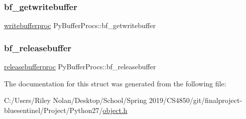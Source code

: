 \subsubsection{\texorpdfstring{bf\_getwritebuffer}{bf\_getwritebuffer}}
{\footnotesize\ttfamily \mbox{\hyperlink{_python27_2object_8h_ad1d2777d883d3c28a2dd703b1031e1dd}{writebufferproc}} Py\+Buffer\+Procs\+::bf\+\_\+getwritebuffer}

\mbox{\label{struct_py_buffer_procs_a549a6d721c9ee3d138b92ac495ad59a1}} 
\subsubsection{\texorpdfstring{bf\_releasebuffer}{bf\_releasebuffer}}
{\footnotesize\ttfamily \mbox{\hyperlink{__pygame_8h_adfedb341571d379d3146eb4d59019023}{releasebufferproc}} Py\+Buffer\+Procs\+::bf\+\_\+releasebuffer}



The documentation for this struct was generated from the following file\+:\begin{DoxyCompactItemize}
\item 
C\+:/\+Users/\+Riley Nolan/\+Desktop/\+School/\+Spring 2019/\+C\+S4850/git/finalproject-\/bluesentinel/\+Project/\+Python27/\mbox{\hyperlink{_python27_2object_8h}{object.\+h}}\end{DoxyCompactItemize}
